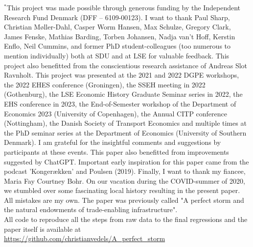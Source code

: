 \documentclass[11pt]{article}
\begin{document}
\begin{titlepage}
    \vfill
    
    \footnotesize
    $^*$This project was made possible through generous funding by the Independent Research Fund Denmark (DFF – 6109-00123). I want to thank Paul Sharp, Christian Møller-Dahl, Casper Worm Hansen, Max Schulze, Gregory Clark, James Fenske, Mathias Barding, Torben Johansen, Nadja van't Hoff, Kerstin Enflo, Neil Cummins, and former PhD student-colleagues (too numerous to mention individually) both at SDU and at LSE for valuable feedback. This project also benefitted from the conscientious research assistance of Andreas Slot Ravnholt. This project was presented at the 2021 and 2022 DGPE workshops, the 2022 EHES conference (Groningen), the SSEH meeting in 2022 (Gothenburg), the LSE Economic History Graduate Seminar series in 2022, the EHS conference in 2023, the End-of-Semester workshop of the Department of Economics 2023 (University of Copenhagen), the Annual CITP conference (Nottingham), the Danish Society of Transport Economics and multiple times at the PhD seminar series at the Department of Economics (University of Southern Denmark). I am grateful for the insightful comments and suggestions by participants at these events. This paper also benefitted from improvements suggested by ChatGPT. Important early inspiration for this paper came from the podcast 'Kongerækken' and Poulsen (2019). Finally, I want to thank my fiancee, Maria Fay Courtney Bohr. On our vacation during the COVID-summer of 2020, we stumbled over some fascinating local history resulting in the present paper.  All mistakes are my own. The paper was previously called "A perfect storm and the natural endowments of trade-enabling infrastructure". \\
    All code to reproduce all the steps from raw data to the final regressions and the paper itself is available at \\ \url{https://github.com/christianvedels/A_perfect_storm}
    

\end{titlepage}
\newpage
\end{document}
